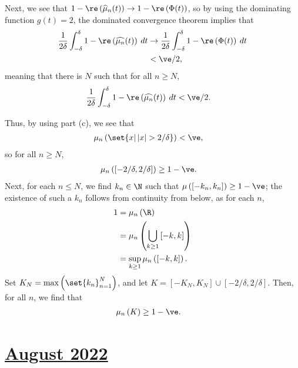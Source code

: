\documentclass[10pt]{mypackage}
\begin{document}
\begin{enumerate}[(a)]
    Next, we see that $1-\re\left( \widehat{\mu}_n(t) \right)\rightarrow 1-\re\left( \Phi(t) \right)$, so by using the dominating function $g(t) = 2$, the dominated convergence theorem implies that
    \begin{align*}
      \frac{1}{2\delta} \int_{-\delta}^{\delta} 1-\re\left( \widehat{\mu_n}(t) \right)\:dt &\rightarrow \frac{1}{2\delta}\int_{-\delta}^{\delta} 1-\re\left( \Phi(t) \right)\:dt\\
                                                                                           &< \ve/2,
    \end{align*}
    meaning that there is $N$ such that for all $n\geq N$,
    \begin{align*}
      \frac{1}{2\delta} \int_{-\delta}^{\delta} 1-\re\left( \widehat{\mu_n}(t) \right)\:dt &< \ve/2.
    \end{align*}
    
    Thus, by using part (c), we see that
    \begin{align*}
      \mu_n\left( \set{x | \left\vert x \right\vert > 2/\delta} \right) &< \ve,
    \end{align*}
    so for all $n\geq N$,
    \begin{align*}
      \mu_n\left( \left[ -2/\delta,2/\delta \right] \right) &\geq 1-\ve.
    \end{align*}
    Next, for each $n\leq N$, we find $k_n\in \N$ such that $\mu\left( \left[ -k_n,k_n \right] \right) \geq 1-\ve$; the existence of such a $k_n$ follows from continuity from below, as for each $n$,
    \begin{align*}
      1 &= \mu_n\left( \R \right)\\
        &= \mu_n\left( \bigcup_{k\geq 1}\left[ -k,k \right] \right)\\
        &= \sup_{k\geq 1} \mu_n\left( \left[-k,k\right] \right).
    \end{align*}
    Set $K_N = \max\left( \set{k_n}_{n=1}^{N} \right)$, and let $K = \left[ -K_N,K_N \right]\cup \left[ -2/\delta,2/\delta \right]$. Then, for all $n$, we find that
    \begin{align*}
      \mu_n\left( K \right) &\geq 1-\ve.
    \end{align*}
\end{enumerate}
\section{\href{https://math.virginia.edu/graduate/exams/analysis/2022Aug_real.pdf}{August 2022}}%
\end{document}
